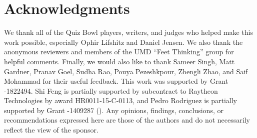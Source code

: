 \section*{Acknowledgments}

We thank all of the Quiz Bowl players, writers, and judges who helped
make this work possible, especially Ophir Lifshitz and Daniel Jensen.
We also thank the anonymous reviewers and members of the UMD ``Feet
Thinking'' group for helpful comments.
Finally, we would also like to thank Sameer Singh, Matt Gardner,
Pranav Goel, Sudha Rao, Pouya Pezeshkpour, Zhengli Zhao, and Saif
Mohammad for their useful feedback.
This work was supported by  Grant -1822494.  Shi
Feng is partially supported by subcontract to Raytheon 
Technologies by  award HR0011-15-C-0113, and Pedro
Rodriguez is partially supported by  Grant -1409287
().
Any opinions, findings, conclusions, or recommendations expressed here
are those of the authors and do not necessarily reflect the view of
the sponsor.
